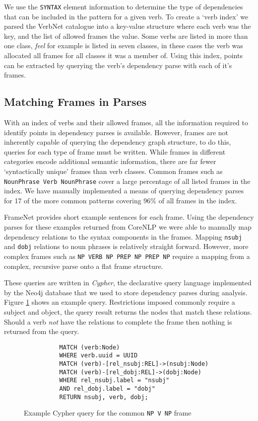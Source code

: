       We use the \texttt{SYNTAX} element information to determine the type of dependencies that can be included in the pattern for a given verb. To create a `verb index' we parsed the VerbNet catalogue into a key-value structure where each verb was the key, and the list of allowed frames the value. Some verbs are listed in more than one class, \textit{feel} for example is listed in seven classes, in these cases the verb was allocated all frames for all classes it was a member of. Using this index, points can be extracted by querying the verb's dependency parse with each of it's frames.

    \tocless\subsection{Matching Frames in Parses}
      With an index of verbs and their allowed frames, all the information required to identify points in dependency parses is available. However, frames are not inherently capable of querying the dependency graph structure, to do this, queries for each type of frame must be written. While frames in different categories encode additional semantic information, there are far fewer `syntactically unique' frames than verb classes. Common frames such as \texttt{NounPhrase Verb NounPhrase} cover a large percentage of all listed frames in the index. We have manually implemented a means of querying dependency parses for 17 of the more common patterns covering 96\% of all frames in the index.

      FrameNet provides short example sentences for each frame. Using the dependency parses for these examples returned from CoreNLP we were able to manually map dependency relations to the syntax components in the frames. Mapping \texttt{nsubj} and \texttt{dobj} relations to noun phrases is relatively straight forward. However, more complex frames such as \texttt{NP VERB NP PREP NP PREP NP} require a mapping from a complex, recursive parse onto a flat frame structure.

      These queries are written in \textit{Cypher}, the declarative query language implemented by the Neo4j database that we used to store dependency parses during analysis. Figure \ref{fig:npvnpquery} shows an example query. Restrictions imposed commonly require a subject and object, the query result returns the nodes that match these relations. Should a verb \textit{not} have the relations to complete the frame then nothing is returned from the query.

      \begin{figure}
        \centering
        \caption{Example Cypher query for the common \texttt{NP V NP} frame}

        \begin{lstlisting}
          MATCH (verb:Node)
          WHERE verb.uuid = UUID
          MATCH (verb)-[rel_nsubj:REL]->(nsubj:Node)
          MATCH (verb)-[rel_dobj:REL]->(dobj:Node)
          WHERE rel_nsubj.label = "nsubj"
          AND rel_dobj.label = "dobj"
          RETURN nsubj, verb, dobj;
        \end{lstlisting}
        \label{fig:npvnpquery}
      \end{figure}

